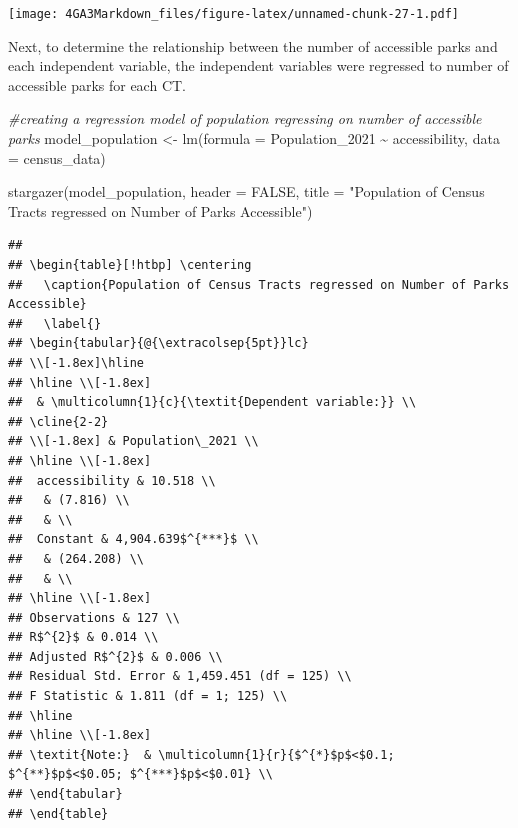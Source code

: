 \documentclass[
]{article}
\newenvironment{Shaded}{\begin{snugshade}}{\end{snugshade}}
\newcommand{\AttributeTok}[1]{\textcolor[rgb]{0.77,0.63,0.00}{#1}}
\newcommand{\CommentTok}[1]{\textcolor[rgb]{0.56,0.35,0.01}{\textit{#1}}}
\newcommand{\ConstantTok}[1]{\textcolor[rgb]{0.00,0.00,0.00}{#1}}
\newcommand{\FunctionTok}[1]{\textcolor[rgb]{0.00,0.00,0.00}{#1}}
\newcommand{\NormalTok}[1]{#1}
\newcommand{\OtherTok}[1]{\textcolor[rgb]{0.56,0.35,0.01}{#1}}
\newcommand{\SpecialCharTok}[1]{\textcolor[rgb]{0.00,0.00,0.00}{#1}}
\newcommand{\StringTok}[1]{\textcolor[rgb]{0.31,0.60,0.02}{#1}}
\begin{document}
\texttt{[image: 4GA3Markdown\_files/figure-latex/unnamed-chunk-27-1.pdf]}

Next, to determine the relationship between the number of accessible
parks and each independent variable, the independent variables were
regressed to number of accessible parks for each CT.

\begin{Shaded}
\begin{Highlighting}[]
\CommentTok{\#creating a regression model of population regressing on number of accessible parks}
\NormalTok{model\_population }\OtherTok{\textless{}{-}} \FunctionTok{lm}\NormalTok{(}\AttributeTok{formula =}\NormalTok{ Population\_2021 }\SpecialCharTok{\textasciitilde{}}\NormalTok{ accessibility, }
             \AttributeTok{data =}\NormalTok{ census\_data)}

\FunctionTok{stargazer}\NormalTok{(model\_population,}
          \AttributeTok{header =} \ConstantTok{FALSE}\NormalTok{,}
          \AttributeTok{title =} \StringTok{"Population of Census Tracts regressed on Number of Parks Accessible"}\NormalTok{)}
\end{Highlighting}
\end{Shaded}

\begin{verbatim}
## 
## \begin{table}[!htbp] \centering 
##   \caption{Population of Census Tracts regressed on Number of Parks Accessible} 
##   \label{} 
## \begin{tabular}{@{\extracolsep{5pt}}lc} 
## \\[-1.8ex]\hline 
## \hline \\[-1.8ex] 
##  & \multicolumn{1}{c}{\textit{Dependent variable:}} \\ 
## \cline{2-2} 
## \\[-1.8ex] & Population\_2021 \\ 
## \hline \\[-1.8ex] 
##  accessibility & 10.518 \\ 
##   & (7.816) \\ 
##   & \\ 
##  Constant & 4,904.639$^{***}$ \\ 
##   & (264.208) \\ 
##   & \\ 
## \hline \\[-1.8ex] 
## Observations & 127 \\ 
## R$^{2}$ & 0.014 \\ 
## Adjusted R$^{2}$ & 0.006 \\ 
## Residual Std. Error & 1,459.451 (df = 125) \\ 
## F Statistic & 1.811 (df = 1; 125) \\ 
## \hline 
## \hline \\[-1.8ex] 
## \textit{Note:}  & \multicolumn{1}{r}{$^{*}$p$<$0.1; $^{**}$p$<$0.05; $^{***}$p$<$0.01} \\ 
## \end{tabular} 
## \end{table}
\end{verbatim}
\end{document}
